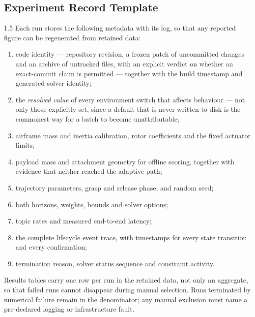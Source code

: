 \begin{appendices}
\clearpage
\chapter{Experiment Record Template}

\begin{spacing}{1.5}
Each run stores the following metadata with its log, so that any reported figure
can be regenerated from retained data:
\begin{enumerate}
\item code identity --- repository revision, a frozen patch of uncommitted
changes and an archive of untracked files, with an explicit verdict on whether an
exact-commit claim is permitted --- together with the build timestamp and
generated-solver identity;
\item the \emph{resolved value} of every environment switch that affects
behaviour --- not only those explicitly set, since a default that is never
written to disk is the commonest way for a batch to become unattributable;
\item airframe mass and inertia calibration, rotor coefficients and the fixed
actuator limits;
\item payload mass and attachment geometry for offline scoring, together with
evidence that neither reached the adaptive path;
\item trajectory parameters, grasp and release phase, and random seed;
\item both horizons, weights, bounds and solver options;
\item topic rates and measured end-to-end latency;
\item the complete lifecycle event trace, with timestamps for every state
transition and every confirmation;
\item termination reason, solver status sequence and constraint activity.
\end{enumerate}

Results tables carry one row per run in the retained data, not only an aggregate,
so that failed runs cannot disappear during manual selection. Runs terminated by
numerical failure remain in the denominator; any manual exclusion must name a
pre-declared logging or infrastructure fault.
\end{spacing}

\end{appendices}
